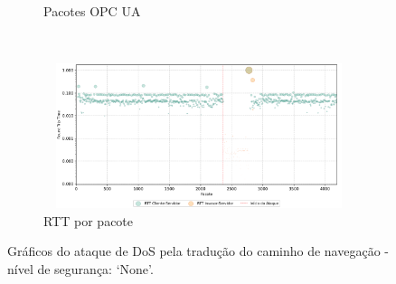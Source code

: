 \begin{apendicesenv}
\begin{figure}[htbp!]
\begin{subfigure}[t]{0.5\textwidth}
        \caption{Pacotes OPC UA}
    \end{subfigure}%
    ~
    \begin{subfigure}[t]{0.5\textwidth}
        \centering
        \includegraphics[width=1\textwidth, height=120pt]{USPSC-img/output/cropped/0-dos_translate_browse_path_call_stack_overflow-rttp.png}
        \caption{RTT por pacote}
    \end{subfigure}%
    \label{fig:0-dos_translate_browse_path_call_stack_overflow}
    \caption{Gráficos do ataque de DoS pela tradução do caminho de navegação - nível de segurança: `None'.}
\end{figure}


\end{apendicesenv}
